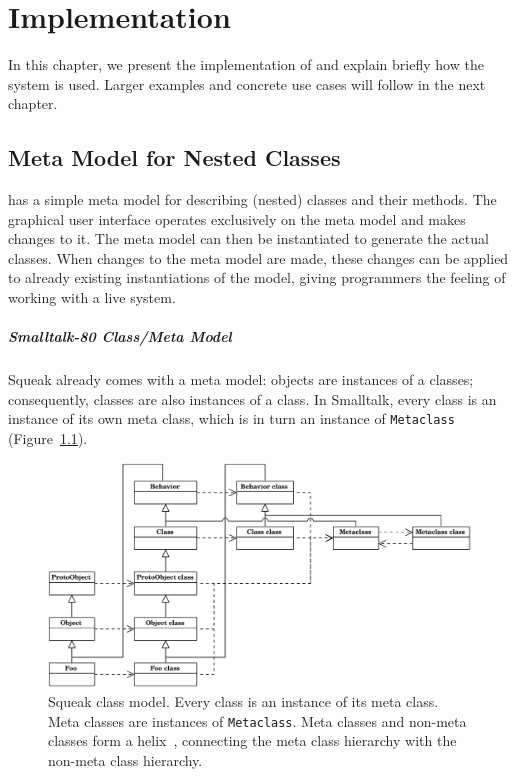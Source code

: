 \chapter{Implementation}
\label{sec:impl}
In this chapter, we present the implementation of \msname and explain briefly how the system is used. Larger examples and concrete use cases will follow in the next chapter.

\section{Meta Model for Nested Classes}
\label{sec:impl_meta_model}
\msname has a simple meta model for describing (nested) classes and their methods. The graphical user interface operates exclusively on the meta model and makes changes to it. The meta model can then be instantiated to generate the actual classes. When changes to the meta model are made, these changes can be applied to already existing instantiations of the model, giving programmers the feeling of working with a live system.

\paragraph{Smalltalk-80 Class/Meta Model}
Squeak already comes with a meta model: objects are instances of a classes; consequently, classes are also instances of a class. In Smalltalk, every class is an instance of its own meta class, which is in turn an instance of \texttt{Metaclass} (Figure~\ref{fig:impl_squeak_meta}).

\begin{figure}
	\includegraphics[width=\textwidth]{squeak_meta.pdf}
	\centering
	\caption[Squeak class model]{Squeak class model. Every class is an instance of its meta class. Meta classes are instances of \texttt{Metaclass}. Meta classes and non-meta classes form a helix~\cite{Briot:1989:PEM:74877.74921}, connecting the meta class hierarchy with the non-meta class hierarchy.}
	\label{fig:impl_squeak_meta}
\end{figure}

